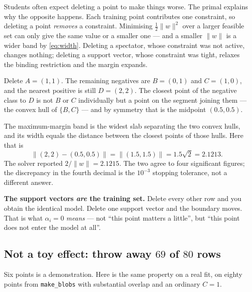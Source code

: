 \documentclass[11pt]{article}
\begin{document}
Students often expect deleting a point to make things worse. The primal
explains why the opposite happens. Each training point contributes one
constraint, so deleting a point \emph{removes} a constraint. Minimising
$\tfrac12\|w\|^2$ over a larger feasible set can only give the same value or a
smaller one --- and a smaller $\|w\|$ is a wider band by \eqref{eq:width}.
Deleting a spectator, whose constraint was not active, changes nothing;
deleting a support vector, whose constraint was tight, relaxes the binding
restriction and the margin expands.

\begin{worked}
Delete $A = (1,1)$. The remaining negatives are $B = (0,1)$ and $C = (1,0)$,
and the nearest positive is still $D = (2,2)$. The closest point of the
negative class to $D$ is not $B$ or $C$ individually but a point on the segment
joining them --- the convex hull of $\{B, C\}$ --- and by symmetry that is the
midpoint $(0.5, 0.5)$.

The maximum-margin band is the widest slab separating the two convex hulls, and
its width equals the distance between the closest points of those hulls. Here
that is
\[
  \|(2,2) - (0.5, 0.5)\| = \|(1.5, 1.5)\| = 1.5\sqrt2 = 2.1213 .
\]
The solver reported $2/\|w\| = 2.1215$. The two agree to four significant
figures; the discrepancy in the fourth decimal is the $10^{-3}$ stopping
tolerance, not a different answer.
\end{worked}

\begin{keyidea}
\textbf{The support vectors \emph{are} the training set.} Delete every other
row and you obtain the identical model. Delete one support vector and the
boundary moves. That is what $\alpha_i = 0$ \emph{means} --- not ``this point
matters a little'', but ``this point does not enter the model at all''.
\end{keyidea}

\subsection{Not a toy effect: throw away $69$ of $80$ rows}

Six points is a demonstration. Here is the same property on a real fit, on
eighty points from \texttt{make\_blobs} with substantial overlap and an
ordinary $C = 1$.
\end{document}
